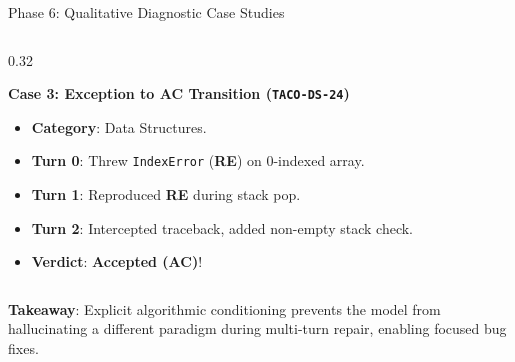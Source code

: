 \documentclass[aspectratio=169,10pt]{beamer}
\begin{document}
\begin{frame}{Phase 6: Qualitative Diagnostic Case Studies}
\begin{columns}[T]
    \begin{column}{0.32\textwidth}
      \begin{alertblock}{\textbf{Case 3: Exception to AC Transition (\texttt{TACO-DS-24})}}
        \begin{itemize}\itemsep=2pt\tiny
          \item \textbf{Category}: Data Structures.
          \item \textbf{Turn 0}: Threw \texttt{IndexError} (\textbf{RE}) on 0-indexed array.
          \item \textbf{Turn 1}: Reproduced \textbf{RE} during stack pop.
          \item \textbf{Turn 2}: Intercepted traceback, added non-empty stack check.
          \item \textbf{Verdict}: \textbf{Accepted (AC)}!
        \end{itemize}
      \end{alertblock}
    \end{column}
  \end{columns}

  \vspace{3pt}
  \begin{center}
    \scriptsize
    \textbf{Takeaway}: Explicit algorithmic conditioning prevents the model from hallucinating a different paradigm during multi-turn repair, enabling focused bug fixes.
  \end{center}
\end{frame}
\end{document}
